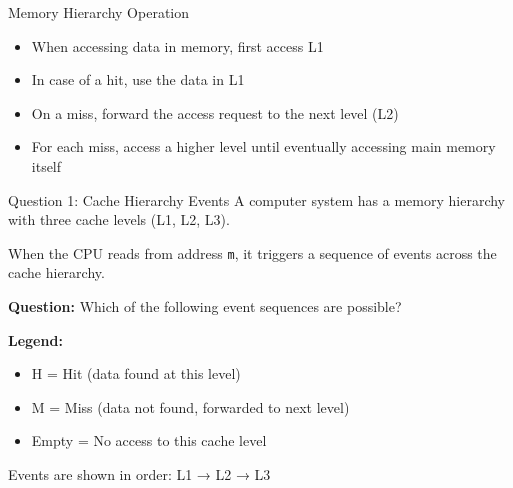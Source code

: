 \documentclass[aspectratio=169,12pt]{beamer}
\begin{document}
\begin{frame}{Memory Hierarchy Operation}
\begin{itemize}
    \item When accessing data in memory, first access L1
    \item In case of a hit, use the data in L1
    \item On a miss, forward the access request to the next level (L2)
    \item For each miss, access a higher level until eventually accessing main memory itself
\end{itemize}
\vspace{0.5cm}
\begin{center}
\end{center}
\end{frame}

\begin{frame}{Question 1: Cache Hierarchy Events}
A computer system has a memory hierarchy with three cache levels (L1, L2, L3).

When the CPU reads from address \texttt{m}, it triggers a sequence of events across the cache hierarchy.

\vspace{0.3cm}

\textbf{Question:} Which of the following event sequences are possible?

\vspace{0.3cm}
\small
\textbf{Legend:}
\begin{itemize}
    \item H = Hit (data found at this level)
    \item M = Miss (data not found, forwarded to next level)
    \item Empty = No access to this cache level
\end{itemize}

Events are shown in order: L1 → L2 → L3
\end{frame}
\end{document}
